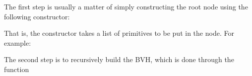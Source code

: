 \documentclass[letterpaper,10pt,english]{sphinxmanual}
\begin{document}
\sphinxAtStartPar
The first step is usually a matter of simply constructing the root node using the following constructor:

\begin{sphinxVerbatim}[commandchars=\\\{\}]
\end{sphinxVerbatim}

\sphinxAtStartPar
That is, the constructor takes a list of primitives to be put in the node.
For example:

\begin{sphinxVerbatim}[commandchars=\\\{\}]


\end{sphinxVerbatim}

\sphinxAtStartPar
The second step is to recursively build the BVH, which is done through the function
\end{document}
